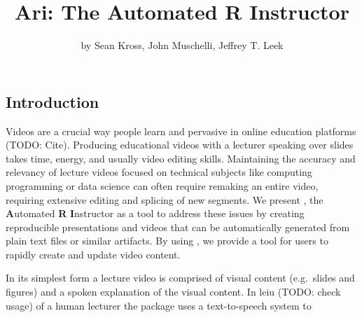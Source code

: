 \title{Ari: The Automated R Instructor}
\author{by Sean Kross, John Muschelli, Jeffrey T. Leek}

\maketitle



\hypertarget{introduction}{%
\subsection{Introduction}\label{introduction}}

Videos are a crucial way people learn and pervasive in online education
platforms (TODO: Cite). Producing educational videos with a lecturer
speaking over slides takes time, energy, and usually video editing
skills. Maintaining the accuracy and relevancy of lecture videos focused
on technical subjects like computing programming or data science can
often require remaking an entire video, requiring extensive editing and
splicing of new segments. We present , the
\textbf{A}utomated \textbf{R} \textbf{I}nstructor as a tool to address
these issues by creating reproducible presentations and videos that can
be automatically generated from plain text files or similar artifacts.
By using , we provide a tool for users to rapidly create and
update video content.

In its simplest form a lecture video is comprised of visual content
(e.g.~slides and figures) and a spoken explanation of the visual
content. In leiu (TODO: check usage) of a human lecturer the 
package uses a text-to-speech system to

